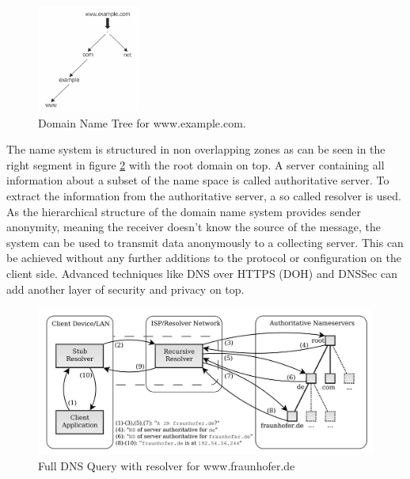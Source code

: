         \begin{figure}
            \includegraphics[width=0.3\textwidth]{latex/figures/domain_name_tree.jpg}
            \caption[Domain Name Tree for www.example.com.]{Domain Name Tree for www.example.com. \cite{jeftovic_managing_2018}}
            \label{fig:dns_tree}
        \end{figure}
        
        The name system is structured in non overlapping zones as can be seen in the right segment in figure \ref{fig:dns_query} with the root domain on top\cite{herrmann_beobachtungsmoglichkeiten_2016}.
        A server containing all information about a subset of the name space is called authoritative server. To extract the information from the authoritative server, a so called resolver is used\cite{friedewald_privacy_2018}.
        As the hierarchical structure of the domain name system provides sender anonymity, meaning the receiver doesn't know the source of the message, the system can be used to transmit data anonymously to a collecting server. This can be achieved without any further additions to the protocol or configuration on the client side.
        Advanced techniques like DNS over HTTPS (DOH)\cite{} and DNSSec\cite{} can add another layer of security and privacy on top.
        
        \begin{figure}
            \centering
            \includegraphics[width=\textwidth]{latex/figures/dns_query.jpg}
            \caption[Full DNS Query with resolver for www.fraunhofer.de]{Full DNS Query with resolver for                 www.fraunhofer.de\cite{friedewald_privacy_2018}}
            \label{fig:dns_query}
        \end{figure}
        

